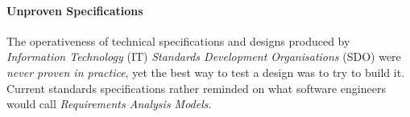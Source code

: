 %
%
%
%
%
%
%

\paragraph{Unproven Specifications}
\label{unproven_specifications_heading}

The operativeness of technical specifications and designs produced by
\emph{Information Technology} (IT) \emph{Standards Development Organisations}
(SDO) were \emph{never proven in practice}, yet the best way to test a design
was to try to build it. Current standards specifications rather reminded on
what software engineers would call \emph{Requirements Analysis Models}.

